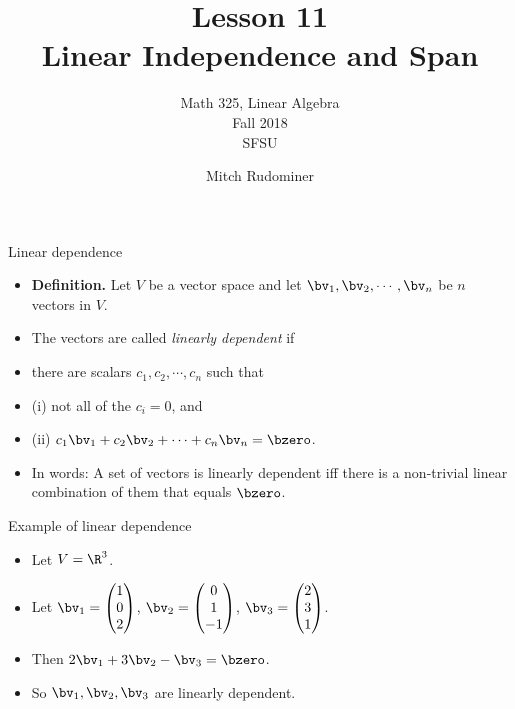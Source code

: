 \documentclass{beamer}
\title{Lesson 11 \\ Linear Independence and Span}
\subtitle{Math 325, Linear Algebra \\ Fall 2018 \\ SFSU}
\author{Mitch Rudominer}
\date{}
\begin{document}
\begin{frame}
  \titlepage
\end{frame}

\begin{frame}{Linear dependence}

\begin{itemize}
\item \textbf{Definition.} Let $V$ be a vector space and let $\bv_1,\bv_2,\cdots,\bv_n$ be $n$ vectors in $V$.
\item The vectors are called \emph{linearly dependent} if
\item there are scalars $c_1,c_2,\cdots,c_n$ such that
\item (i) not all of the $c_i = 0$, and
\item (ii) $c_1 \bv_1 + c_2 \bv_2 + \cdots + c_n\bv_n = \bzero$.
\item In words: A set of vectors is linearly dependent iff there is a non-trivial linear combination
of them that equals $\bzero$.
\end{itemize}

\end{frame}

\begin{frame}{Example of linear dependence}

\begin{itemize}
\item Let $V = \R^3$.
\item Let $\bv_1 =
\begin{pmatrix}
1 \\ 0 \\ 2
\end{pmatrix}
$,
$\bv_2 =
\begin{pmatrix}
0 \\ 1 \\ -1
\end{pmatrix}
$,
$\bv_3 =
\begin{pmatrix}
2 \\ 3 \\ 1
\end{pmatrix}
$.

\item Then $2\bv_1+3\bv_2 - \bv_3 = \bzero$.
\item So $\bv_1, \bv_2, \bv_3$ are linearly dependent.
\end{itemize}

\end{frame}
\end{document}
